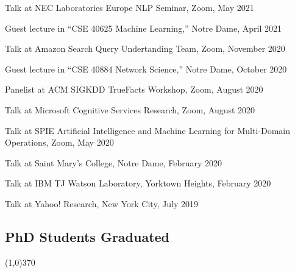 \documentclass[10pt]{article}
\newenvironment{myindentpar}[1]%
{\begin{list}{}%
         {\setlength{\leftmargin}{#1}}%
         \item[]%
}
{\end{list}}
\newcounter{list}
\begin{document}
\begin{myindentpar}{0.75cm}
\hspace{-0.75cm} Talk at NEC Laboratories Europe NLP Seminar, Zoom, May 2021
	
\hspace{-0.75cm} Guest lecture in ``CSE 40625 Machine Learning,'' Notre Dame, April 2021
	
\hspace{-0.75cm} Talk at Amazon Search Query Undertanding Team, Zoom, November 2020

\hspace{-0.75cm} Guest lecture in ``CSE 40884 Network Science,'' Notre Dame, October 2020

\hspace{-0.75cm} Panelist at ACM SIGKDD TrueFacts Workshop, Zoom, August 2020
	
\hspace{-0.75cm} Talk at Microsoft Cognitive Services Research, Zoom, August 2020
	
\hspace{-0.75cm} Talk at SPIE Artificial Intelligence and Machine Learning for Multi-Domain Operations, Zoom, May 2020
	
\hspace{-0.75cm} Talk at Saint Mary's College, Notre Dame, February 2020
	
\hspace{-0.75cm} Talk at IBM TJ Watson Laboratory, Yorktown Heights, February 2020
	
\hspace{-0.75cm} Talk at Yahoo! Research, New York City, July 2019

\end{myindentpar}

\subsection{\sc PhD Students Graduated}
\vspace{-0.4cm} \line(1,0){370} \vspace{-0.1cm}
\end{document}
